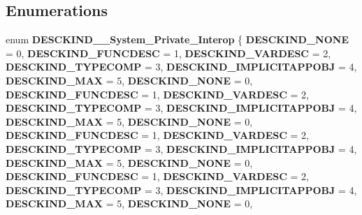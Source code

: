 \subsection*{Enumerations}
\begin{DoxyCompactItemize}
\item 
\mbox{\label{namespace_system_1_1_runtime_1_1_interop_services_1_1_com_types_aa5b48e3d71ce8cd59e7daf1cf1292fc6}} 
enum {\bfseries D\+E\+S\+C\+K\+I\+N\+D\+\_\+\+\_\+\+System\+\_\+\+Private\+\_\+\+Interop} \{ \newline
{\bfseries D\+E\+S\+C\+K\+I\+N\+D\+\_\+\+N\+O\+NE} = 0, 
{\bfseries D\+E\+S\+C\+K\+I\+N\+D\+\_\+\+F\+U\+N\+C\+D\+E\+SC} = 1, 
{\bfseries D\+E\+S\+C\+K\+I\+N\+D\+\_\+\+V\+A\+R\+D\+E\+SC} = 2, 
{\bfseries D\+E\+S\+C\+K\+I\+N\+D\+\_\+\+T\+Y\+P\+E\+C\+O\+MP} = 3, 
\newline
{\bfseries D\+E\+S\+C\+K\+I\+N\+D\+\_\+\+I\+M\+P\+L\+I\+C\+I\+T\+A\+P\+P\+O\+BJ} = 4, 
{\bfseries D\+E\+S\+C\+K\+I\+N\+D\+\_\+\+M\+AX} = 5, 
{\bfseries D\+E\+S\+C\+K\+I\+N\+D\+\_\+\+N\+O\+NE} = 0, 
{\bfseries D\+E\+S\+C\+K\+I\+N\+D\+\_\+\+F\+U\+N\+C\+D\+E\+SC} = 1, 
\newline
{\bfseries D\+E\+S\+C\+K\+I\+N\+D\+\_\+\+V\+A\+R\+D\+E\+SC} = 2, 
{\bfseries D\+E\+S\+C\+K\+I\+N\+D\+\_\+\+T\+Y\+P\+E\+C\+O\+MP} = 3, 
{\bfseries D\+E\+S\+C\+K\+I\+N\+D\+\_\+\+I\+M\+P\+L\+I\+C\+I\+T\+A\+P\+P\+O\+BJ} = 4, 
{\bfseries D\+E\+S\+C\+K\+I\+N\+D\+\_\+\+M\+AX} = 5, 
\newline
{\bfseries D\+E\+S\+C\+K\+I\+N\+D\+\_\+\+N\+O\+NE} = 0, 
{\bfseries D\+E\+S\+C\+K\+I\+N\+D\+\_\+\+F\+U\+N\+C\+D\+E\+SC} = 1, 
{\bfseries D\+E\+S\+C\+K\+I\+N\+D\+\_\+\+V\+A\+R\+D\+E\+SC} = 2, 
{\bfseries D\+E\+S\+C\+K\+I\+N\+D\+\_\+\+T\+Y\+P\+E\+C\+O\+MP} = 3, 
\newline
{\bfseries D\+E\+S\+C\+K\+I\+N\+D\+\_\+\+I\+M\+P\+L\+I\+C\+I\+T\+A\+P\+P\+O\+BJ} = 4, 
{\bfseries D\+E\+S\+C\+K\+I\+N\+D\+\_\+\+M\+AX} = 5, 
{\bfseries D\+E\+S\+C\+K\+I\+N\+D\+\_\+\+N\+O\+NE} = 0, 
{\bfseries D\+E\+S\+C\+K\+I\+N\+D\+\_\+\+F\+U\+N\+C\+D\+E\+SC} = 1, 
\newline
{\bfseries D\+E\+S\+C\+K\+I\+N\+D\+\_\+\+V\+A\+R\+D\+E\+SC} = 2, 
{\bfseries D\+E\+S\+C\+K\+I\+N\+D\+\_\+\+T\+Y\+P\+E\+C\+O\+MP} = 3, 
{\bfseries D\+E\+S\+C\+K\+I\+N\+D\+\_\+\+I\+M\+P\+L\+I\+C\+I\+T\+A\+P\+P\+O\+BJ} = 4, 
{\bfseries D\+E\+S\+C\+K\+I\+N\+D\+\_\+\+M\+AX} = 5, 
\newline
{\bfseries D\+E\+S\+C\+K\+I\+N\+D\+\_\+\+N\+O\+NE} = 0, 

\end{DoxyCompactItemize}
